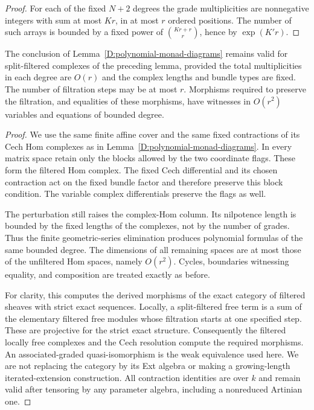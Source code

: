 \begin{proof}
For each of the fixed $N+2$ degrees the grade multiplicities
are nonnegative integers with sum at most $Kr$, in at
most $r$ ordered positions.  The number of such arrays
is bounded by a fixed power of
$\binom{Kr+r}{r}$, hence by $\exp(K'r)$.
\end{proof}

\begin{lemma}
\label{D:filtered-polynomial-diagrams}
The conclusion of Lemma~\ref{D:polynomial-monad-diagrams}
remains valid for split-filtered complexes of the preceding
lemma, provided the total multiplicities in each degree are
$O(r)$ and the complex lengths and bundle types are fixed.
The number of filtration steps may be at most $r$.
Morphisms required to preserve the filtration, and equalities
of these morphisms, have witnesses in $O(r^2)$ variables
and equations of bounded degree.
\end{lemma}

\begin{proof}
We use the same finite affine cover and the same fixed
contractions of its Cech Hom complexes as in
Lemma~\ref{D:polynomial-monad-diagrams}.  In every
matrix space retain only the blocks allowed by the
two coordinate flags.  These form the filtered Hom
complex.  The fixed Cech differential and its
chosen contraction act on the fixed bundle factor
and therefore preserve this block condition.
The variable complex differentials preserve the
flags as well.

The perturbation still raises the complex-Hom
column.  Its nilpotence length is bounded by the
fixed lengths of the complexes, not by the number
of grades.  Thus the finite geometric-series
elimination produces polynomial formulas of the
same bounded degree.  The dimensions of all
remaining spaces are at most those of the
unfiltered Hom spaces, namely $O(r^2)$.
Cycles, boundaries witnessing equality, and
composition are treated exactly as before.

For clarity, this computes the derived morphisms
of the exact category of filtered sheaves with
strict exact sequences.  Locally, a split-filtered
free term is a sum of the elementary filtered
free modules whose filtration starts at one
specified step.  These are projective for the
strict exact structure.  Consequently the
filtered locally free complexes and the Cech
resolution compute the required morphisms.
An associated-graded quasi-isomorphism is the
weak equivalence used here.  We are not replacing
the category by its Ext algebra or making a
growing-length iterated-extension construction.
All contraction identities are over $k$ and
remain valid after tensoring by any parameter
algebra, including a nonreduced Artinian one.
\end{proof}

